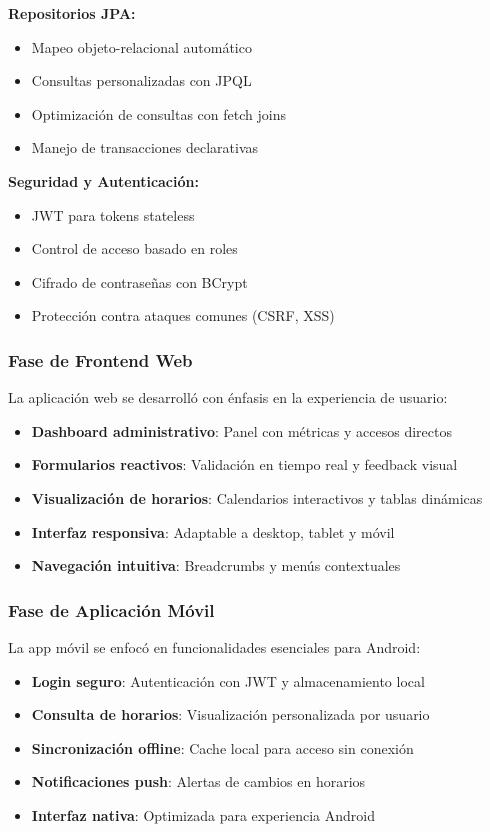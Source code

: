 \textbf{Repositorios JPA:}
\begin{itemize}
\item Mapeo objeto-relacional automático
\item Consultas personalizadas con JPQL
\item Optimización de consultas con fetch joins
\item Manejo de transacciones declarativas
\end{itemize}

\textbf{Seguridad y Autenticación:}
\begin{itemize}
\item JWT para tokens stateless
\item Control de acceso basado en roles
\item Cifrado de contraseñas con BCrypt
\item Protección contra ataques comunes (CSRF, XSS)
\end{itemize}

\subsubsection{Fase de Frontend Web}

La aplicación web se desarrolló con énfasis en la experiencia de usuario:

\begin{itemize}
\item \textbf{Dashboard administrativo}: Panel con métricas y accesos directos
\item \textbf{Formularios reactivos}: Validación en tiempo real y feedback visual
\item \textbf{Visualización de horarios}: Calendarios interactivos y tablas dinámicas
\item \textbf{Interfaz responsiva}: Adaptable a desktop, tablet y móvil
\item \textbf{Navegación intuitiva}: Breadcrumbs y menús contextuales
\end{itemize}

\subsubsection{Fase de Aplicación Móvil}

La app móvil se enfocó en funcionalidades esenciales para Android:

\begin{itemize}
\item \textbf{Login seguro}: Autenticación con JWT y almacenamiento local
\item \textbf{Consulta de horarios}: Visualización personalizada por usuario
\item \textbf{Sincronización offline}: Cache local para acceso sin conexión
\item \textbf{Notificaciones push}: Alertas de cambios en horarios
\item \textbf{Interfaz nativa}: Optimizada para experiencia Android
\end{itemize}

